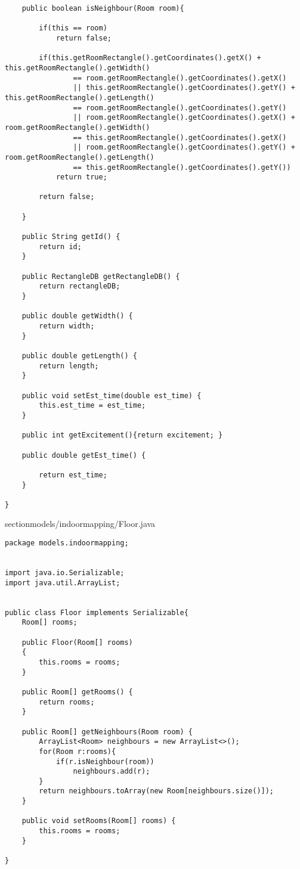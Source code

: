 \documentclass{article}
\begin{document}
\begin{lstlisting}
    public boolean isNeighbour(Room room){

        if(this == room)
            return false;

        if(this.getRoomRectangle().getCoordinates().getX() + this.getRoomRectangle().getWidth()
                == room.getRoomRectangle().getCoordinates().getX()
                || this.getRoomRectangle().getCoordinates().getY() + this.getRoomRectangle().getLength()
                == room.getRoomRectangle().getCoordinates().getY()
                || room.getRoomRectangle().getCoordinates().getX() + room.getRoomRectangle().getWidth()
                == this.getRoomRectangle().getCoordinates().getX()
                || room.getRoomRectangle().getCoordinates().getY() + room.getRoomRectangle().getLength()
                == this.getRoomRectangle().getCoordinates().getY())
            return true;

        return false;

    }

    public String getId() {
        return id;
    }

    public RectangleDB getRectangleDB() {
        return rectangleDB;
    }

    public double getWidth() {
        return width;
    }

    public double getLength() {
        return length;
    }

    public void setEst_time(double est_time) {
        this.est_time = est_time;
    }

    public int getExcitement(){return excitement; }

    public double getEst_time() {

        return est_time;
    }

}
\end{lstlisting}
\newpage
section{models/indoormapping/Floor.java}
\begin{lstlisting}package models.indoormapping;


import java.io.Serializable;
import java.util.ArrayList;


public class Floor implements Serializable{
    Room[] rooms;

    public Floor(Room[] rooms)
    {
        this.rooms = rooms;
    }

    public Room[] getRooms() {
        return rooms;
    }

    public Room[] getNeighbours(Room room) {
        ArrayList<Room> neighbours = new ArrayList<>();
        for(Room r:rooms){
            if(r.isNeighbour(room))
                neighbours.add(r);
        }
        return neighbours.toArray(new Room[neighbours.size()]);
    }

    public void setRooms(Room[] rooms) {
        this.rooms = rooms;
    }

}
\end{lstlisting}
\newpage
\end{document}
